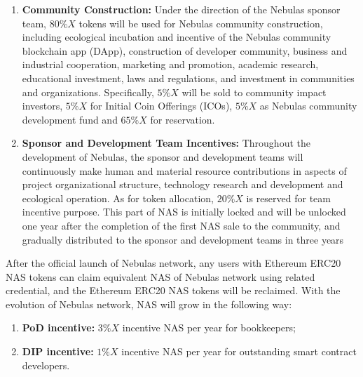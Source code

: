 \begin{enumerate}
	\item \textbf{Community Construction:}
	Under the direction of the Nebulas sponsor team, $80\%X$ tokens will be used for Nebulas community construction, including ecological incubation and incentive of the Nebulas community blockchain app (DApp), construction of developer community, business and industrial cooperation, marketing and promotion, academic research, educational investment, laws and regulations, and investment in communities and organizations. Specifically, $5\%X$ will be sold to community impact investors, $5\%X$ for Initial Coin Offerings (ICOs), $5\%X$ as Nebulas community development fund and $65\%X$ for reservation.
	

	\item \textbf{Sponsor and Development Team Incentives:}
	Throughout the development of Nebulas, the sponsor and development teams will continuously make human and material resource contributions in aspects of project organizational structure, technology research and development and ecological operation. As for token allocation, $20\%X$ is reserved for team incentive purpose. This part of NAS is initially locked and will be unlocked one year after the completion of the first NAS sale to the community, and gradually distributed to the sponsor and development teams in three years
	
\end{enumerate}

After the official launch of Nebulas network, any users with Ethereum ERC20 NAS tokens can claim equivalent NAS of Nebulas network using related credential, and the Ethereum ERC20 NAS tokens will be reclaimed. With the evolution of Nebulas network, NAS will grow in the following way:

\begin{enumerate}
	\item \textbf{PoD incentive:} $3\%X$ incentive NAS per year for bookkeepers;
	
	\item \textbf{DIP incentive:} $1\%X$ incentive NAS per year for outstanding smart contract developers.
\end{enumerate}
